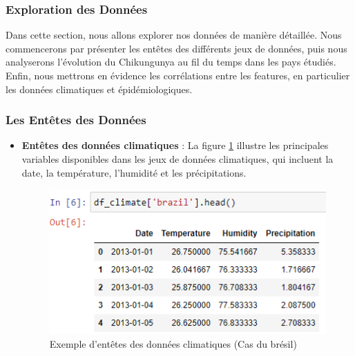 \subsubsection{Exploration des Données}
Dans cette section, nous allons explorer nos données de manière détaillée. Nous commencerons par présenter les entêtes des différents jeux de données, puis nous analyserons l'évolution du Chikungunya au fil du temps dans les pays étudiés. Enfin, nous mettrons en évidence les corrélations entre les features, en particulier les données climatiques et épidémiologiques.

\subsubsection*{Les Entêtes des Données}
\begin{itemize}
	\item \textbf{Entêtes des données climatiques} : La figure \ref{fig:climatedatasetsample} illustre les principales variables disponibles dans les jeux de données climatiques, qui incluent la date, la température, l'humidité et les précipitations.
	\begin{figure}[h!]
		\centering
		\includegraphics[width=0.8\linewidth]{images/climate_dataset_sample}
		\caption[Exemple d'entêtes des données climatiques]{Exemple d'entêtes des données climatiques (Cas du brésil)}
		\label{fig:climatedatasetsample}
	\end{figure}
	

\end{itemize}

